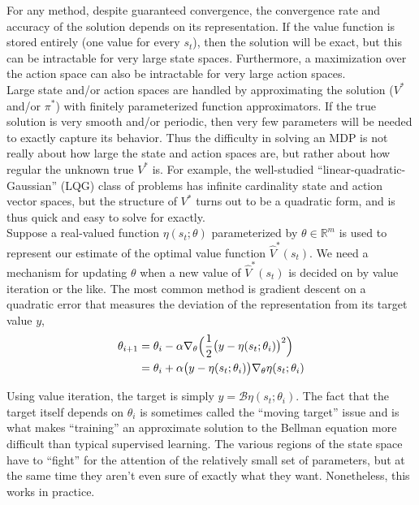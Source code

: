 For any method, despite guaranteed convergence, the convergence rate and accuracy of the solution depends on its representation. If the value function is stored entirely (one value for every $s_t$), then the solution will be exact, but this can be intractable for very large state spaces. Furthermore, a maximization over the action space can also be intractable for very large action spaces.\\

Large state and/or action spaces are handled by approximating the solution ($V^*$ and/or $\pi^*$) with finitely parameterized function approximators. If the true solution is very smooth and/or periodic, then very few parameters will be needed to exactly capture its behavior. Thus the difficulty in solving an MDP is not really about how large the state and action spaces are, but rather about how regular the unknown true $V^*$ is. For example, the well-studied ``linear-quadratic-Gaussian'' (LQG) class of problems has infinite cardinality state and action vector spaces, but the structure of $V^*$ turns out to be a quadratic form, and is thus quick and easy to solve for exactly.\\

Suppose a real-valued function $\eta(s_t;\theta)$ parameterized by $\theta \in \mathbb{R}^m$ is used to represent our estimate of the optimal value function $\hat{V}^*(s_t)$. We need a mechanism for updating $\theta$ when a new value of $\hat{V}^*(s_t)$ is decided on by value iteration or the like. The most common method is gradient descent on a quadratic error that measures the deviation of the representation from its target value $y$,
\begin{align*}
\theta_{i+1} &= \theta_i - \alpha \nabla_{\theta}\Big{(}\dfrac{1}{2}\big{(}y - \eta(s_t;\theta_i)\big{)}^2\Big{)}\\
&= \theta_i + \alpha \big{(}y - \eta(s_t;\theta_i)\big{)}\nabla_{\theta}\eta(s_t;\theta_i)
\end{align*}

Using value iteration, the target is simply $y = \mathcal{B}\eta(s_t;\theta_i)$. The fact that the target itself depends on $\theta_i$ is sometimes called the ``moving target'' issue and is what makes ``training'' an approximate solution to the Bellman equation more difficult than typical supervised learning. The various regions of the state space have to ``fight'' for the attention of the relatively small set of parameters, but at the same time they aren't even sure of exactly what they want. Nonetheless, this works in practice.\\

